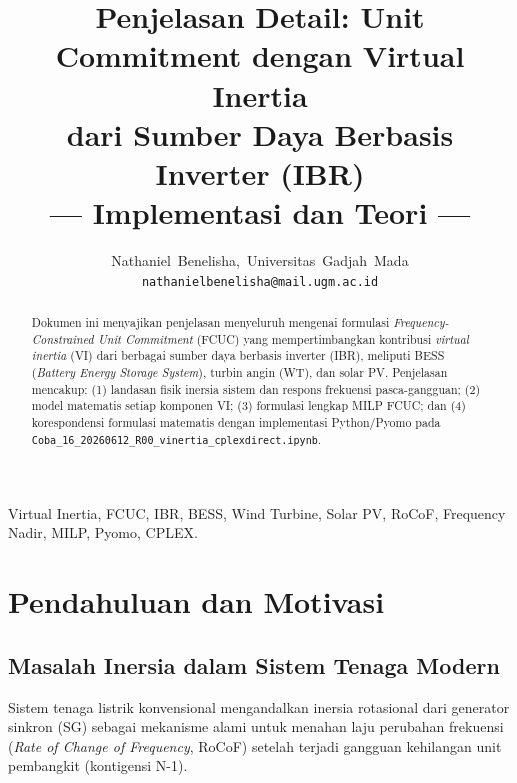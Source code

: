 \documentclass[journal]{IEEEtran}
\begin{document}
\title{Penjelasan Detail: Unit Commitment dengan Virtual Inertia\\
dari Sumber Daya Berbasis Inverter (IBR)\\
--- Implementasi dan Teori ---}

\author{Nathaniel~Benelisha,~Universitas~Gadjah~Mada\\
\texttt{nathanielbenelisha@mail.ugm.ac.id}}

\maketitle

\begin{abstract}
Dokumen ini menyajikan penjelasan menyeluruh mengenai formulasi
\textit{Frequency-Constrained Unit Commitment} (FCUC) yang
mempertimbangkan kontribusi \textit{virtual inertia} (VI)
dari berbagai sumber daya berbasis inverter (IBR), meliputi
BESS (\textit{Battery Energy Storage System}), turbin angin (WT),
dan solar PV. Penjelasan mencakup: (1) landasan fisik inersia sistem
dan respons frekuensi pasca-gangguan; (2) model matematis setiap
komponen VI; (3) formulasi lengkap MILP FCUC; dan (4) korespondensi
formulasi matematis dengan implementasi Python/Pyomo pada
\texttt{Coba\_16\_20260612\_R00\_vinertia\_cplexdirect.ipynb}.
\end{abstract}

\begin{IEEEkeywords}
Virtual Inertia, FCUC, IBR, BESS, Wind Turbine, Solar PV,
RoCoF, Frequency Nadir, MILP, Pyomo, CPLEX.
\end{IEEEkeywords}

\section{Pendahuluan dan Motivasi}
\label{sec:intro}

\subsection{Masalah Inersia dalam Sistem Tenaga Modern}

Sistem tenaga listrik konvensional mengandalkan inersia
rotasional dari generator sinkron (SG) sebagai mekanisme
alami untuk menahan laju perubahan frekuensi
(\textit{Rate of Change of Frequency}, RoCoF) setelah
terjadi gangguan kehilangan unit pembangkit (kontigensi N-1).
\end{document}
